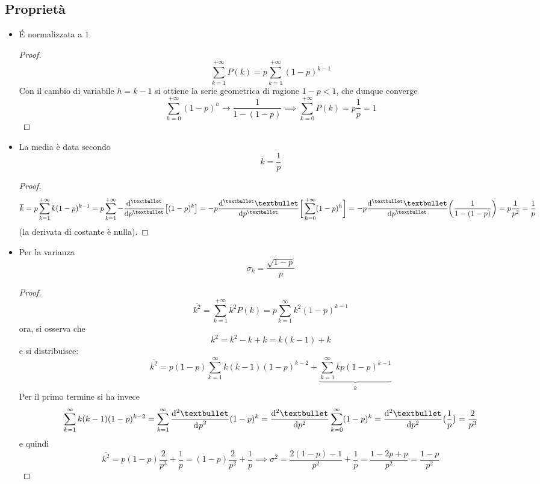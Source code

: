 \documentclass[10pt, oneside]{book}
\begin{document}
\subsection{Proprietà}
\begin{itemize}
\item \'E normalizzata a $1$
\begin{proof}
\[\sum\limits_{k=1}^{+\infty} P(k) = p \sum\limits_{k=1}^{+\infty} (1-p)^{k-1}\]
Con il cambio di variabile $h = k-1$ si ottiene la serie geometrica di ragione $1-p < 1$, che dunque converge
\[\sum\limits_{h=0}^{+\infty} (1-p)^{h} \rightarrow \frac{1}{1-(1-p)} \implies \sum\limits_{k=0}^{+\infty} P(k) = p \frac{1}{p} = 1\]
\end{proof}
\item La media è data secondo
\[\overline{k} = \frac{1}{p}\]
\begin{proof}
\[\overline{k} = p \sum\limits_{k=1}^{+\infty} k (1-p)^{k-1} = p \sum\limits_{k=1}^{+\infty} - \dv[•]{}{p} \big[(1-p)^k\big] = - p \dv[•]{•}{p} \bigg[\sum\limits_{h=0}^{+\infty} (1-p)^h\bigg] = - p \dv[•]{•}{p} \bigg(\frac{1}{1 - (1-p)}\bigg) = p \frac{1}{p^2} = \frac{1}{p}\]
(la derivata di costante è nulla).
\end{proof}

\item Per la varianza
\[\sigma_k = \frac{\sqrt{1-p}}{p}\]
\begin{proof}
\[\overline{k^2} = \sum\limits_{k=1}^{+\infty} k^2 P(k) = p \sum\limits_{k=1}^{\infty} k^2 (1-p)^{k-1}\]
ora, si osserva che
\[k^2 = k^2 - k + k = k (k-1) + k\]
e si distribuisce:
\[\overline{k^2} = p (1-p) \sum\limits_{k=1}^{\infty} k (k-1) (1-p)^{k-2} + \underbrace{\sum\limits_{k=1}^{\infty} k p (1-p)^{k-1}}_{\overline{k}}\]
Per il primo termine si ha invece
\[\sum\limits_{k=1}^{\infty} k (k-1) (1-p)^{k-2} = \sum\limits_{k=1}^{\infty} \frac{\dd[2]{•}}{\dd[]{p}^2} (1-p)^k = \dv[2]{•}{p} \sum\limits_{k=0}^{\infty} (1-p)^k = \dv[2]{•}{p} \big(\frac{1}{p}\big) = \frac{2}{p^3}\]
e quindi
\[\overline{k^2} = p (1-p) \frac{2}{p^3} + \frac{1}{p} = (1-p) \frac{2}{p^2} + \frac{1}{p} \implies \sigma^2 = \frac{2(1-p) - 1}{p^2} + \frac{1}{p} = \frac{1 - 2p + p}{p^2} = \frac{1-p}{p^2}\]
\end{proof}
\end{itemize}
\end{document}
